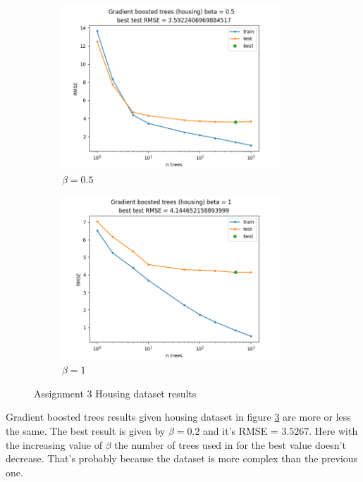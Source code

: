 \documentclass[12pt]{article}
\begin{document}
\begin{figure}[!h]
\begin{subfigure}[b]{0.49\textwidth}
        \includegraphics[width=0.9\textwidth]{plots/03/02-housing-0-5.png}
        \caption{$\beta = 0.5$}
        \label{fig:03-housing-0.5}
    \end{subfigure}
    \begin{subfigure}[b]{0.49\textwidth}
        \centering
        \includegraphics[width=0.9\textwidth]{plots/03/02-housing-1.png}
        \caption{$\beta = 1$}
        \label{fig:03-housing-1}
    \end{subfigure}
    \caption{Assignment 3 Housing dataset results}
    \label{fig:03-housing}
\end{figure}

Gradient boosted trees results given housing dataset in figure \ref{fig:03-housing} are more or less the same. The best result is given by $\beta = 0.2$ and it's RMSE = $3.5267$. Here with the increasing value of $\beta$ the number of trees used in for the best value doesn't decrease. That's probably because the dataset is more complex than the previous one.
\end{document}
